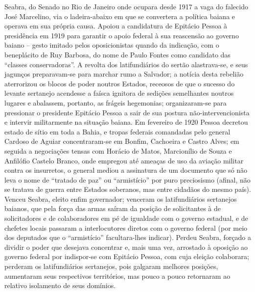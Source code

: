 Seabra, do Senado no Rio de Janeiro onde ocupara desde 1917 a vaga do falecido José Marcelino, via o ladeira-abaixo em que se convertera a política baiana e operava em sua própria causa. Apoiou a candidatura de Epitácio Pessoa à presidência em 1919 para garantir o apoio federal à sua reascensão ao governo baiano -- gesto imitado pelos oposicionistas quando da indicação, com o beneplácito de Ruy Barbosa, do nome de Paulo Fontes como candidato das ``classes conservadoras''. A revolta dos latifundiários do sertão alastrava-se, e seus jagunços preparavam-se para marchar rumo a Salvador; a notícia desta rebelião aterrorizou os blocos de poder noutros Estados, receosos de que o sucesso do levante sertanejo acendesse a faísca ignitora de sedições semelhantes noutros lugares e abalassem, portanto, as frágeis hegemonias; organizaram-se para pressionar o presidente Epitácio Pessoa a sair de sua postura não-intervencionista e intervir militarmente na situação baiana. Em fevereiro de 1920 Pessoa decretou estado de sítio em toda a Bahia, e tropas federais comandadas pelo general Cardoso de Aguiar concentraram-se em Bonfim, Cachoeira e Castro Alves; em seguida a negociações tensas com Horácio de Matos, Marcionílio de Souza e Anfilófio Castelo Branco, onde empregou até ameaças de uso da aviação militar contra os insurretos, o general mediou a assinatura de um documento que só não leva o nome de ``tratado de paz'' ou ``armistício'' por puro preciosismo (afinal, não se tratava de guerra entre Estados soberanos, mas entre cidadãos do mesmo país). Venceu Seabra, eleito enfim governador; venceram os latifundiários sertanejos baianos, que pela força das armas saíram da posição de solicitantes à de solicitadores e de colaboradores em pé de igualdade com o governo estadual, e de chefetes locais passaram a interlocutores diretos com o governo federal (por meio dos deputados que o ``armistício'' facultara-lhes indicar). Perdeu Seabra, forçado a dividir o poder que desejava concentrar e, mais uma vez, arrostado à oposição ao governo federal por indispor-se com Epitácio Pessoa, com cuja eleição colaborara; perderam os latifundiários sertanejos, pois galgaram melhores posições, aumentaram seus respectivos territórios, mas pouco a pouco retornaram ao relativo isolamento de seus domínios.

